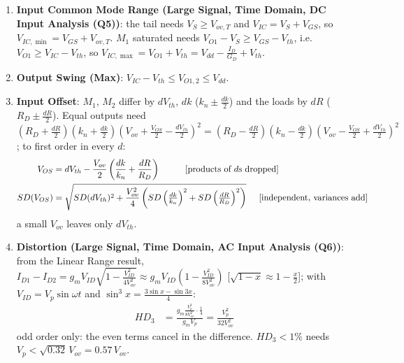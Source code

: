 \begin{enumerate}
    \paragraph{At Output:} \(V_{id} = 0\), half circuit CS output (Section~\ref{sec:amp_cs}):
    \(Z_{out} = R_D \parallel r_o\) per side.
  \item \textbf{Input Common Mode Range (Large Signal, Time Domain, DC Input Analysis (Q5))}: the tail needs
    \(V_S \geq V_{ov,T}\) and \(V_{IC} = V_S + V_{GS}\), so
    \(V_{IC,\min} = V_{GS} + V_{ov,T}\). \(M_1\) saturated needs
    \(V_{O1} - V_S \geq V_{GS} - V_{th}\), i.e. \(V_{O1} \geq V_{IC} - V_{th}\), so
    \(V_{IC,\max} = V_{O1} + V_{th} = V_{dd} - \frac{I_D}{G_D} + V_{th}\).
  \item \textbf{Output Swing (Max)}: \(V_{IC} - V_{th} \leq V_{O1,2} \leq V_{dd}\).
  \item \textbf{Input Offset}: \(M_1\), \(M_2\) differ by \(dV_{th}\), \(dk\) (\(k_n \pm \frac{dk}{2}\)) and the loads by
    \(dR\) (\(R_D \pm \frac{dR}{2}\)). Equal outputs need \((R_D + \frac{dR}{2})(k_n + \frac{dk}{2})(V_{ov} + \frac{V_{OS}}{2} - \frac{dV_{th}}{2})^2 =
    (R_D - \frac{dR}{2})(k_n - \frac{dk}{2})(V_{ov} - \frac{V_{OS}}{2} + \frac{dV_{th}}{2})^2\); to first order in every \(d\):
    \begin{align*}
      V_{OS} &= dV_{th} - \frac{V_{ov}}{2}\left(\frac{dk}{k_n} + \frac{dR}{R_D}\right) \hspace{1cm} [\text{products of } d\text{s dropped}] \\
      SD(V_{OS}) &= \sqrt{SD(dV_{th})^2 + \frac{V_{ov}^2}{4}\left(SD\left(\tfrac{dk}{k_n}\right)^2 + SD\left(\tfrac{dR}{R_D}\right)^2\right)} \hspace{0.5cm} [\text{independent, variances add}]
    \end{align*}
    a small \(V_{ov}\) leaves only \(dV_{th}\).
  \item \textbf{Distortion (Large Signal, Time Domain, AC Input Analysis (Q6))}: from the Linear Range result,
    \(I_{D1} - I_{D2} = g_m V_{ID}\sqrt{1 - \frac{V_{ID}^2}{4V_{ov}^2}} \approx g_m V_{ID}\left(1 - \frac{V_{ID}^2}{8V_{ov}^2}\right)\) [\(\sqrt{1 - x} \approx 1 - \frac{x}{2}\)];
    with \(V_{ID} = V_p\sin\omega t\) and \(\sin^3 x = \frac{3\sin x - \sin 3x}{4}\):
    \begin{align*}
      HD_3 &= \frac{g_m\frac{V_p^3}{8V_{ov}^2}\cdot\frac{1}{4}}{g_m V_p} = \frac{V_p^2}{32V_{ov}^2}
    \end{align*}
    odd order only: the even terms cancel in the difference. \(HD_3 < 1\%\) needs \(V_p < \sqrt{0.32}\,V_{ov} = 0.57\,V_{ov}\).

\end{enumerate}
